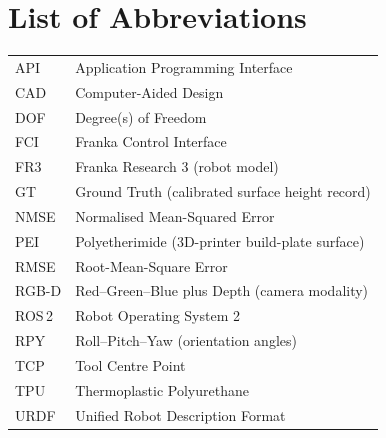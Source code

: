 \chapter*{\rm\bfseries List of Abbreviations}
\label{ch:acronyms}

\begin{table}[!h]
\begin{tabular}{l l}
\textsc{API} & Application Programming Interface \\
\textsc{CAD} & Computer-Aided Design \\
\textsc{DOF} & Degree(s) of Freedom \\
\textsc{FCI} & Franka Control Interface \\
\textsc{FR3} & Franka Research 3 (robot model) \\
\textsc{GT} & Ground Truth (calibrated surface height record) \\
\textsc{NMSE} & Normalised Mean-Squared Error \\
\textsc{PEI} & Polyetherimide (3D-printer build-plate surface) \\
\textsc{RMSE} & Root-Mean-Square Error \\
\textsc{RGB-D} & Red--Green--Blue plus Depth (camera modality) \\
\textsc{ROS\,2} & Robot Operating System 2 \\
\textsc{RPY} & Roll--Pitch--Yaw (orientation angles) \\
\textsc{TCP} & Tool Centre Point \\
\textsc{TPU} & Thermoplastic Polyurethane \\
\textsc{URDF} & Unified Robot Description Format \\
\end{tabular}
\end{table}
